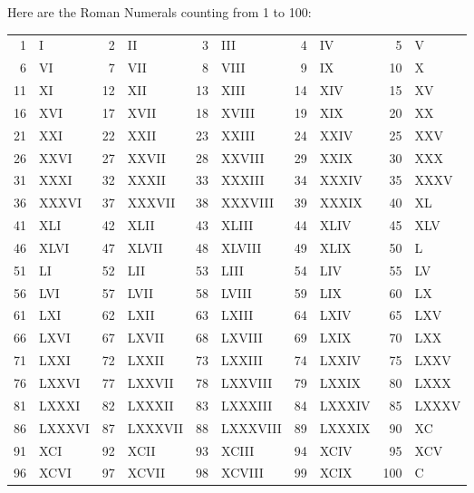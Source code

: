 \documentclass{article}
\begin{document}
Here are the Roman Numerals counting from 1 to 100:\\
\begin{center}
\begin{table}[ht]
\scriptsize
\renewcommand*{\arraystretch}{1.4}
\begin{tabular}{rlrlrlrlrl}
1  & I      & 2  & II      & 3  & III      & 4  & IV     & 5  & V    \\
6  & VI     & 7  & VII     & 8  & VIII     & 9  & IX     & 10 & X    \\
11 & XI     & 12 & XII     & 13 & XIII     & 14 & XIV    & 15 & XV   \\
16 & XVI    & 17 & XVII    & 18 & XVIII    & 19 & XIX    & 20 & XX   \\
21 & XXI    & 22 & XXII    & 23 & XXIII    & 24 & XXIV   & 25 & XXV  \\
26 & XXVI   & 27 & XXVII   & 28 & XXVIII   & 29 & XXIX   & 30 & XXX  \\
31 & XXXI   & 32 & XXXII   & 33 & XXXIII   & 34 & XXXIV  & 35 & XXXV \\
36 & XXXVI  & 37 & XXXVII  & 38 & XXXVIII  & 39 & XXXIX  & 40 & XL   \\
41 & XLI    & 42 & XLII    & 43 & XLIII    & 44 & XLIV   & 45 & XLV  \\
46 & XLVI   & 47 & XLVII   & 48 & XLVIII   & 49 & XLIX   & 50 & L    \\
51 & LI     & 52 & LII     & 53 & LIII     & 54 & LIV    & 55 & LV   \\
56 & LVI    & 57 & LVII    & 58 & LVIII    & 59 & LIX    & 60 & LX   \\
61 & LXI    & 62 & LXII    & 63 & LXIII    & 64 & LXIV   & 65 & LXV  \\
66 & LXVI   & 67 & LXVII   & 68 & LXVIII   & 69 & LXIX   & 70 & LXX  \\
71 & LXXI   & 72 & LXXII   & 73 & LXXIII   & 74 & LXXIV  & 75 & LXXV \\
76 & LXXVI  & 77 & LXXVII  & 78 & LXXVIII  & 79 & LXXIX  & 80 & LXXX \\
81 & LXXXI  & 82 & LXXXII  & 83 & LXXXIII  & 84 & LXXXIV & 85 & LXXXV\\
86 & LXXXVI & 87 & LXXXVII & 88 & LXXXVIII & 89 & LXXXIX & 90 & XC   \\
91 & XCI    & 92 & XCII    & 93 & XCIII    & 94 & XCIV   & 95 & XCV  \\
96 & XCVI   & 97 & XCVII   & 98 & XCVIII   & 99 & XCIX   & 100& C    \\
\end{tabular}
\end{table}
\end{center}
\end{document}
